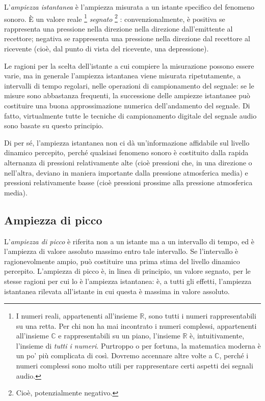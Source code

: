 L'\emph{ampiezza istantanea} è l'ampiezza misurata a un istante specifico del fenomeno sonoro. È un valore reale%
\footnote{I numeri reali, appartenenti all'insieme $\mathbb{R}$, sono tutti i numeri rappresentabili su una retta. Per chi non ha mai incontrato i numeri complessi, appartenenti all'insieme $\mathbb{C}$ e rappresentabili su un piano, l'insieme $\mathbb{R}$ è, intuitivamente, l'insieme di \emph{tutti i numeri}. Purtroppo o per fortuna, la matematica moderna è un po' più complicata di così. Dovremo accennare altre volte a $\mathbb{C}$, perché i numeri complessi sono molto utili per rappresentare certi aspetti dei segnali audio.}
\emph{segnato}%
\footnote{Cioè, potenzialmente negativo.}
: convenzionalmente, è positiva se rappresenta una pressione nella direzione nella direzione dall'emittente al recettore; negativa se rappresenta una pressione nella direzione dal recettore al ricevente (cioè, dal punto di vista del ricevente, una depressione). 

Le ragioni per la scelta dell'istante a cui compiere la misurazione possono essere varie, ma in generale l'ampiezza istantanea viene misurata ripetutamente, a intervalli di tempo regolari, nelle operazioni di campionamento del segnale: se le misure sono abbastanza frequenti, la successione delle ampiezze istantanee può costituire una buona approssimazione numerica dell'andamento del segnale. Di fatto, virtualmente tutte le tecniche di campionamento digitale del segnale audio sono basate su questo principio. 

Di per sé, l'ampiezza istantanea non ci dà un'informazione affidabile sul livello dinamico percepito, perché qualsiasi fenomeno sonoro è costituito dalla rapida alternanza di pressioni relativamente alte (cioè pressioni che, in una direzione o nell'altra, deviano in maniera importante dalla pressione atmosferica media) e pressioni relativamente basse (cioè pressioni prossime alla pressione atmosferica media). 


\subsection{Ampiezza di picco}

L'\emph{ampiezza di picco} è riferita non a un istante ma a un intervallo di tempo, ed è l'ampiezza di valore assoluto massimo entro tale intervallo. Se l'intervallo è ragionevolmente ampio, può costituire una prima stima del livello dinamico percepito. L'ampiezza di picco è, in linea di principio, un valore segnato, per le stesse ragioni per cui lo è l'ampiezza istantanea: è, a tutti gli effetti, l'ampiezza istantanea rilevata all'istante in cui questa è massima in valore assoluto.

